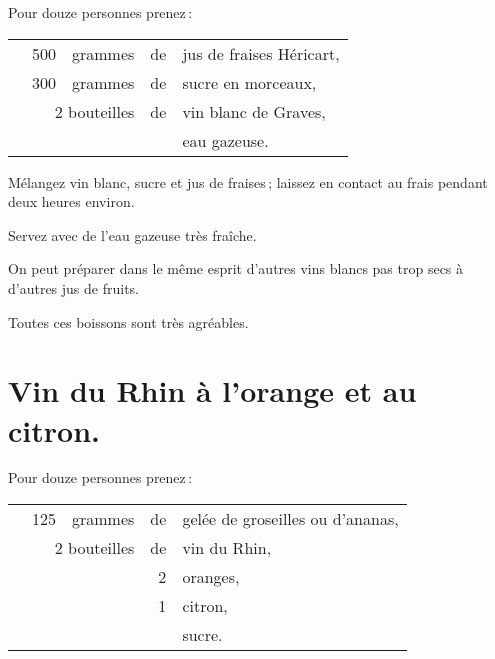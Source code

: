 Pour douze personnes prenez :

\footnotesize
\begin{longtable}{rrrrp{16em}}
  &   500 & grammes & de & jus de fraises Héricart,                                                       \\
  &   300 & grammes & de & sucre en morceaux,                                                             \\
  & \multicolumn{2}{r}{2 bouteilles} & de & vin blanc de Graves,                                          \\
  &       &         &    & eau gazeuse.                                                                   \\
\end{longtable}
\normalsize

Mélangez vin blanc, sucre et jus de fraises ; laissez en contact au frais
pendant deux heures environ.

Servez avec de l'eau gazeuse très fraîche.

\sk

On peut préparer dans le même esprit d'autres vins blancs pas trop secs à
d'autres jus de fruits.

\medskip

Toutes ces boissons sont très agréables.

\section*{\centering Vin du Rhin à l'orange et au citron.}
{}

Pour douze personnes prenez :

\footnotesize
\begin{longtable}{rrrrp{16em}}
  & 125 & grammes & de & gelée de groseilles ou d'ananas,                                                 \\
  & \multicolumn{2}{r}{2 bouteilles} & de & vin du Rhin,                                                  \\
  &     &         &  2 & oranges,                                                                         \\
  &     &         &  1 & citron,                                                                          \\
  &     &         &    & sucre.                                                                           \\
\end{longtable}
\normalsize

